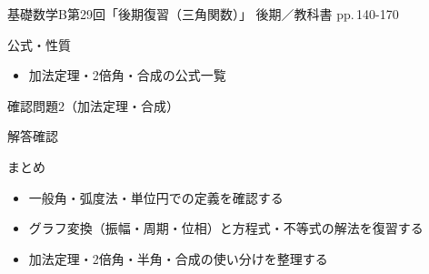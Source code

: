 \documentclass[aspectratio=43,professionalfonts,handout]{beamer}
\newcommand{\LectureNum}{29}
\newcommand{\LectureTitle}{後期復習（三角関数）}
\newcommand{\TextPages}{pp.\,140-170}
\newcommand{\CourseName}{基礎数学B}
\renewcommand{\TermName}{後期}
\begin{document}
\begin{frame}{\CourseName\quad 第\LectureNum 回「\LectureTitle 」}
  {\small \TermName\quad \TeacherName\quad ／\quad 教科書 \TextPages}

\end{frame}

\begin{frame}{公式・性質}
  \begin{block}{}
  \begin{itemize}
    \item 加法定理・2倍角・合成の公式一覧
  \end{itemize}
  \end{block}
\end{frame}

\begin{frame}{確認問題2（加法定理・合成）}
\end{frame}

\begin{frame}{解答確認}
\end{frame}

\begin{frame}{まとめ}
  \begin{itemize}
    \item 一般角・弧度法・単位円での定義を確認する
    \item グラフ変換（振幅・周期・位相）と方程式・不等式の解法を復習する
    \item 加法定理・2倍角・半角・合成の使い分けを整理する
  \end{itemize}
\end{frame}
\end{document}
